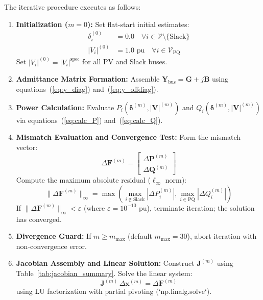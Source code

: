 \documentclass[12pt,a4paper,oneside]{report}
\begin{document}
The iterative procedure executes as follows:
\begin{enumerate}
    \item \textbf{Initialization ($m = 0$):} Set flat-start initial estimates:
    \begin{align}
    \delta_i^{(0)} &= 0.0 \quad \forall i \in \mathcal{V} \setminus \{\text{Slack}\} \\
    |V_i|^{(0)} &= 1.0\text{ pu} \quad \forall i \in \mathcal{V}_{\text{PQ}}
    \end{align}
    Set $|V_i|^{(0)} = |V_i|^{\text{spec}}$ for all PV and Slack buses.
    \item \textbf{Admittance Matrix Formation:} Assemble $\mathbf{Y}_{\text{bus}} = \mathbf{G} + j\mathbf{B}$ using equations~(\ref{eq:y_diag}) and~(\ref{eq:y_offdiag}).
    \item \textbf{Power Calculation:} Evaluate $P_i(\boldsymbol{\delta}^{(m)}, |\mathbf{V}|^{(m)})$ and $Q_i(\boldsymbol{\delta}^{(m)}, |\mathbf{V}|^{(m)})$ via equations~(\ref{eq:calc_P}) and~(\ref{eq:calc_Q}).
    \item \textbf{Mismatch Evaluation and Convergence Test:} Form the mismatch vector:
    \begin{equation}
    \Delta \mathbf{F}^{(m)} = \begin{bmatrix} \Delta \mathbf{P}^{(m)} \\ \Delta \mathbf{Q}^{(m)} \end{bmatrix}
    \end{equation}
    Compute the maximum absolute residual ($\ell_\infty$ norm):
    \begin{equation}
    \|\Delta \mathbf{F}^{(m)}\|_\infty = \max \left( \max_{i \notin \text{Slack}} |\Delta P_i^{(m)}|, \max_{i \in \text{PQ}} |\Delta Q_i^{(m)}| \right)
    \end{equation}
    If $\|\Delta \mathbf{F}^{(m)}\|_\infty < \varepsilon$ (where $\varepsilon = 10^{-10}\text{ pu}$), terminate iteration; the solution has converged.
    \item \textbf{Divergence Guard:} If $m \ge m_{\max}$ (default $m_{\max} = 30$), abort iteration with non-convergence error.
    \item \textbf{Jacobian Assembly and Linear Solution:} Construct $\mathbf{J}^{(m)}$ using Table~\ref{tab:jacobian_summary}. Solve the linear system:
    \begin{equation}
    \mathbf{J}^{(m)} \, \Delta \mathbf{x}^{(m)} = \Delta \mathbf{F}^{(m)}
    \end{equation}
    using LU factorization with partial pivoting (`np.linalg.solve`).

\end{enumerate}
\end{document}
